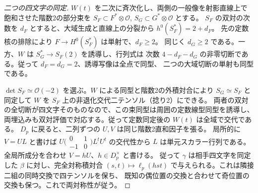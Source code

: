 \begin{proof}[二つの四文字の同定]
$W(t)$ を二次に斉次化し、両側の一般像を射影直線上で飽和させた階数2の部分束を
$S_F\subset F^*\otimes\mathcal O$, $S_G\subset G^*\otimes\mathcal O$ とする。
$S_F$ の双対の次数を $d_F$ とすると、大域生成と直線上の分裂から $h^0(S_F^*)=2+d_F$。
先の定数核の排除により $F\to H^0(S_F^*)$ は単射で、$d_F\ge2$。
同じく $d_G\ge2$ である。一方、$W$ は $S_G^*\to S_F(2)$ を誘導し、行列式は
次数 $4-d_F-d_G$ の非零切断である。従って $d_F=d_G=2$、誘導写像は全点で同型、
二つの大域切断の単射も同型である。

$\det S_F\simeq\mathcal O(-2)$ を選ぶ。$W$ による同型と階数2の外積対合により
$S_G\simeq S_F$ と同定して $W$ を $S_F$ 上の非退化交代二テンソル（捻り2）にできる。
両者の双対の全切断が四文字そのものなので、この束同型は周囲の定数線型同型を誘導し、
両埋込みも双対評価で対応する。従って定数同定後の $W(t)$ は全域で交代である。
$D_p$ に戻ると、二列ずつの $U,V$ は同じ階数2直和因子を張る。
局所的に $V=U L$ と書けば $U\bigl(\begin{smallmatrix}0&1\\-1&0\end{smallmatrix}\bigr)L^t U^t$ の交代性から
$L$ は単元スカラー行列である。全局所成分を合わせ $V=h U$、$h\in D_p^\times$ と書ける。
従って $\gamma$ は相手四文字を同定した $\beta$ に対し、完全対称積対合
$(s,t)\mapsto\ell_p(hst)$ で与えられる。これは隣接二組の同時交換で四テンソルを保ち、
既知の偶位置の交換と合わせて奇位置の交換も保つ。これで両対称性が従う。
\end{proof}

